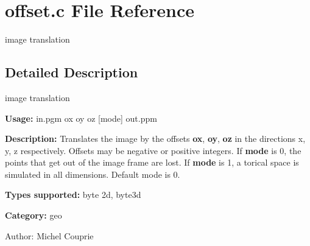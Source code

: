 \section{offset.c File Reference}
\label{offset_8c}
image translation 



\subsection{Detailed Description}
image translation 

{\bf Usage:} in.pgm ox oy oz [mode] out.ppm

{\bf Description:} Translates the image by the offsets {\bf ox}, {\bf oy}, {\bf oz} in the directions x, y, z respectively. Offsets may be negative or positive integers. If {\bf mode} is 0, the points that get out of the image frame are lost. If {\bf mode} is 1, a torical space is simulated in all dimensions. Default mode is 0.

{\bf Types supported:} byte 2d, byte3d

{\bf Category:} geo

\begin{Desc}
\item[Author:]Michel Couprie \end{Desc}
